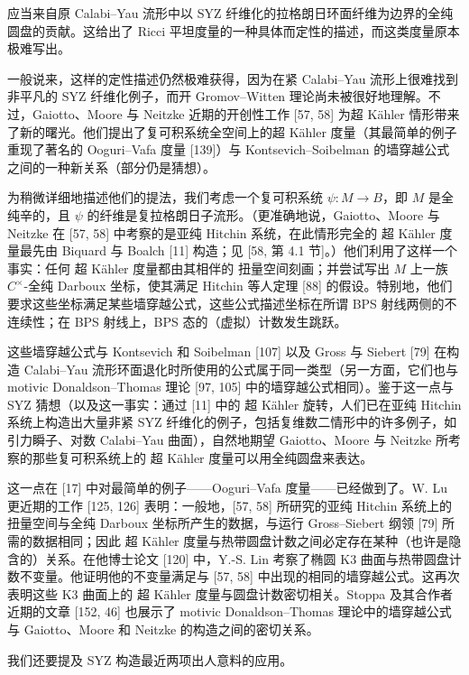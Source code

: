 应当来自原 Calabi--Yau 流形中以 SYZ 纤维化的拉格朗日环面纤维为边界的全纯圆盘的贡献。这给出了 Ricci 平坦度量的一种具体而定性的描述，而这类度量原本极难写出。

一般说来，这样的定性描述仍然极难获得，因为在紧 Calabi--Yau 流形上很难找到非平凡的 SYZ 纤维化例子，而开 Gromov--Witten 理论尚未被很好地理解。不过，Gaiotto、Moore 与 Neitzke 近期的开创性工作 [57, 58] 为超 K\"ahler 情形带来了新的曙光。他们提出了复可积系统全空间上的超 K\"ahler 度量（其最简单的例子重现了著名的 Ooguri--Vafa 度量 [139]）与 Kontsevich--Soibelman 的墙穿越公式之间的一种新关系（部分仍是猜想）。

为稍微详细地描述他们的提法，我们考虑一个复可积系统 $\psi : M \to B$，即 $M$ 是全纯辛的，且 $\psi$ 的纤维是复拉格朗日子流形。（更准确地说，Gaiotto、Moore 与 Neitzke 在 [57, 58] 中考察的是亚纯 Hitchin 系统，在此情形完全的 超 Kähler 度量最先由 Biquard 与 Boalch [11] 构造；见 [58, 第 4.1 节]。）他们利用了这样一个事实：任何 超 Kähler 度量都由其相伴的 扭量空间刻画；并尝试写出 $M$ 上一族 $C^\times$-全纯 Darboux 坐标，使其满足 Hitchin 等人定理 [88] 的假设。特别地，他们要求这些坐标满足某些墙穿越公式，这些公式描述坐标在所谓 BPS 射线两侧的不连续性；在 BPS 射线上，BPS 态的（虚拟）计数发生跳跃。

这些墙穿越公式与 Kontsevich 和 Soibelman [107] 以及 Gross 与 Siebert [79] 在构造 Calabi--Yau 流形环面退化时所使用的公式属于同一类型（另一方面，它们也与 motivic Donaldson--Thomas 理论 [97, 105] 中的墙穿越公式相同）。鉴于这一点与 SYZ 猜想（以及这一事实：通过 [11] 中的 超 Kähler 旋转，人们已在亚纯 Hitchin 系统上构造出大量非紧 SYZ 纤维化的例子，包括复维数二情形中的许多例子，如引力瞬子、对数 Calabi--Yau 曲面），自然地期望 Gaiotto、Moore 与 Neitzke 所考察的那些复可积系统上的 超 Kähler 度量可以用全纯圆盘来表达。

这一点在 [17] 中对最简单的例子------Ooguri--Vafa 度量------已经做到了。W. Lu 更近期的工作 [125, 126] 表明：一般地，[57, 58] 所研究的亚纯 Hitchin 系统上的 扭量空间与全纯 Darboux 坐标所产生的数据，与运行 Gross--Siebert 纲领 [79] 所需的数据相同；因此 超 Kähler 度量与热带圆盘计数之间必定存在某种（也许是隐含的）关系。在他博士论文 [120] 中，Y.-S. Lin 考察了椭圆 K3 曲面与热带圆盘计数不变量。他证明他的不变量满足与 [57, 58] 中出现的相同的墙穿越公式。这再次表明这些 K3 曲面上的 超 Kähler 度量与圆盘计数密切相关。Stoppa 及其合作者近期的文章 [152, 46] 也展示了 motivic Donaldson--Thomas 理论中的墙穿越公式与 Gaiotto、Moore 和 Neitzke 的构造之间的密切关系。

我们还要提及 SYZ 构造最近两项出人意料的应用。

